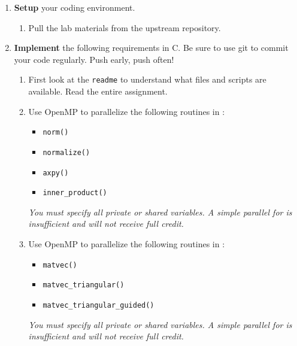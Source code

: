 \documentclass[letter]{article}
\newcommand{\mypath}[1]{\texttt{\path{#1}}}
\begin{document}
\begin{enumerate}

    \item \textbf{Setup} your coding environment.
        \begin{enumerate}
            \item Pull the lab materials from the upstream repository.
        \end{enumerate}

    \item \textbf{Implement} the following requirements in C.  Be sure to use git to commit your code regularly.  Push early, push often!
        \begin{enumerate}
            \item First look at the \texttt{readme} to understand what files and scripts are available.  Read the entire assignment.
            \item Use OpenMP to parallelize the following routines in \mypath{vector.c}:
                \begin{itemize}
                    \item \texttt{norm()}
                    \item \texttt{normalize()}
                    \item \texttt{axpy()}
                    \item \texttt{inner\_product()}
                \end{itemize}
                \emph{You must specify all private or shared variables.  A simple parallel for is insufficient and will not receive full credit.}
            \item Use OpenMP to parallelize the following routines in \mypath{matrix.c}:
                \begin{itemize}
                    \item \texttt{matvec()}
                    \item \texttt{matvec\_triangular()}
                    \item \texttt{matvec\_triangular\_guided()}
                \end{itemize}
                \emph{You must specify all private or shared variables.  A simple parallel for is insufficient and will not receive full credit.}


\end{enumerate}
\end{enumerate}
\end{document}
